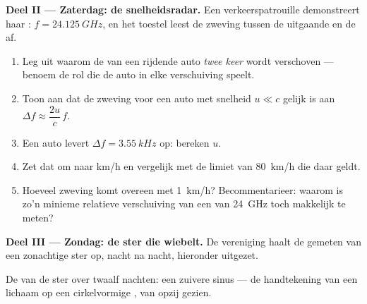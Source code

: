 \begin{problem}
\medskip
\noindent\textbf{Deel II --- Zaterdag: de snelheidsradar.}
Een verkeerspatrouille demonstreert haar : $f = \qty{24.125}{GHz}$,
en het toestel leest de zweving tussen de uitgaande  en de  af.
\begin{enumerate}[resume]
  \item Leg uit waarom de  van een rijdende auto \emph{twee keer}
        wordt verschoven --- benoem de rol die de auto in elke
        verschuiving speelt.
  \item Toon aan dat de zweving voor een auto met snelheid $u \ll c$
        gelijk is aan $\Delta f \approx \dfrac{2u}{c}\,f$.
  \item Een auto levert $\Delta f = \qty{3.55}{kHz}$ op: bereken $u$.
  \item Zet dat om naar \unit{km/h} en vergelijk met de limiet van
        \qty{80}{km/h} die daar geldt.
  \item Hoeveel  zweving komt overeen met \qty{1}{km/h}?
        Becommentarieer: waarom is zo'n minieme relatieve verschuiving van
        een  van \qty{24}{GHz} toch makkelijk te meten?
\end{enumerate}

\medskip
\noindent\textbf{Deel III --- Zondag: de ster die wiebelt.}
De vereniging haalt de gemeten  van een zonachtige ster
op, nacht na nacht, hieronder uitgezet.

\begin{omfigure}

{\small De  van de ster over twaalf nachten: een zuivere
sinus --- de handtekening van een lichaam op een cirkelvormige , van
opzij gezien.}
\end{omfigure}


\end{problem}

